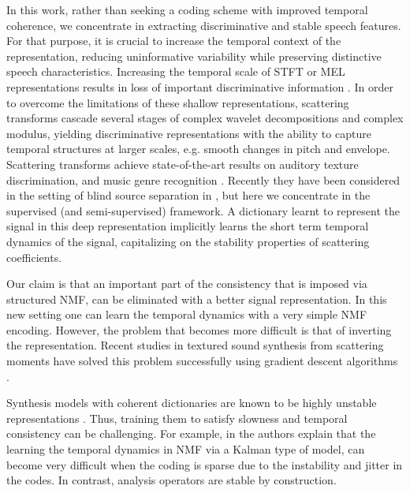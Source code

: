 In this work, rather than seeking a coding scheme with improved temporal coherence, 
we concentrate in extracting discriminative and stable speech features. 
For that purpose, it is crucial to increase the temporal context of the representation, 
reducing uninformative variability while preserving distinctive speech characteristics.
Increasing the temporal scale of STFT or MEL representations results 
in loss of important discriminative information \cite{deepscatt}. 
In order to overcome the limitations of these shallow representations, 
scattering transforms \cite{deepscatt, pami} cascade several 
stages of complex wavelet decompositions and complex modulus, yielding 
discriminative representations with the ability to capture temporal structures at larger scales, 
e.g. smooth changes in pitch and envelope. 
Scattering transforms achieve state-of-the-art results on auditory texture discrimination, and music genre recognition \cite{deepscatt, phdjoan}.
Recently they have been considered in the setting of blind source separation in \cite{stephane_bss}, 
but here we concentrate in the supervised (and semi-supervised) framework.
A dictionary learnt to represent the signal in this deep representation implicitly learns the short term temporal dynamics of the signal,
capitalizing on the stability properties of scattering coefficients.


Our claim is that an important part of the consistency that is imposed via structured NMF, can be eliminated with a better signal representation.
In this new setting one can learn the temporal dynamics with a very simple NMF encoding. However, the problem that becomes
more difficult is that of inverting the representation. Recent studies in textured sound synthesis from scattering
moments have solved this problem successfully using gradient descent algorithms \cite{bruna2013audio}.

Synthesis models with coherent dictionaries are known to be highly unstable representations \cite{jenatton2012local}. 
Thus, training them to satisfy slowness and temporal consistency can be challenging. For example, in \cite{icassp13a}
the authors explain that the learning the temporal dynamics in NMF via a Kalman type of model, can become very difficult
when the coding is sparse due to the instability and jitter in the codes.
In contrast, analysis operators are stable by construction.

